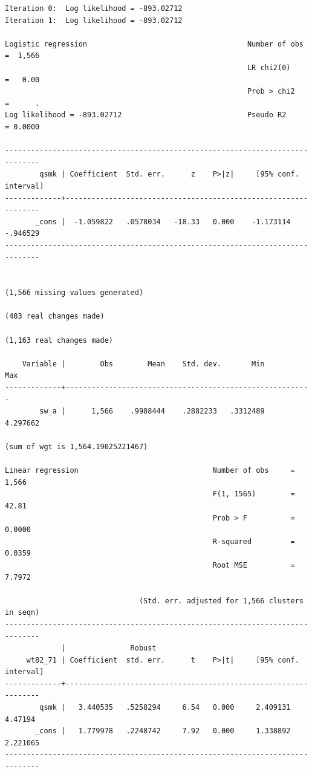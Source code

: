 \documentclass[
  10pt,
  a4paper,
]{book}
\begin{document}
\begin{verbatim}
Iteration 0:  Log likelihood = -893.02712  
Iteration 1:  Log likelihood = -893.02712  

Logistic regression                                     Number of obs =  1,566
                                                        LR chi2(0)    =   0.00
                                                        Prob > chi2   =      .
Log likelihood = -893.02712                             Pseudo R2     = 0.0000

------------------------------------------------------------------------------
        qsmk | Coefficient  Std. err.      z    P>|z|     [95% conf. interval]
-------------+----------------------------------------------------------------
       _cons |  -1.059822   .0578034   -18.33   0.000    -1.173114    -.946529
------------------------------------------------------------------------------


(1,566 missing values generated)

(403 real changes made)

(1,163 real changes made)

    Variable |        Obs        Mean    Std. dev.       Min        Max
-------------+---------------------------------------------------------
        sw_a |      1,566    .9988444    .2882233   .3312489   4.297662

(sum of wgt is 1,564.19025221467)

Linear regression                               Number of obs     =      1,566
                                                F(1, 1565)        =      42.81
                                                Prob > F          =     0.0000
                                                R-squared         =     0.0359
                                                Root MSE          =     7.7972

                               (Std. err. adjusted for 1,566 clusters in seqn)
------------------------------------------------------------------------------
             |               Robust
     wt82_71 | Coefficient  std. err.      t    P>|t|     [95% conf. interval]
-------------+----------------------------------------------------------------
        qsmk |   3.440535   .5258294     6.54   0.000     2.409131     4.47194
       _cons |   1.779978   .2248742     7.92   0.000     1.338892    2.221065
------------------------------------------------------------------------------


\end{verbatim}
\end{document}
